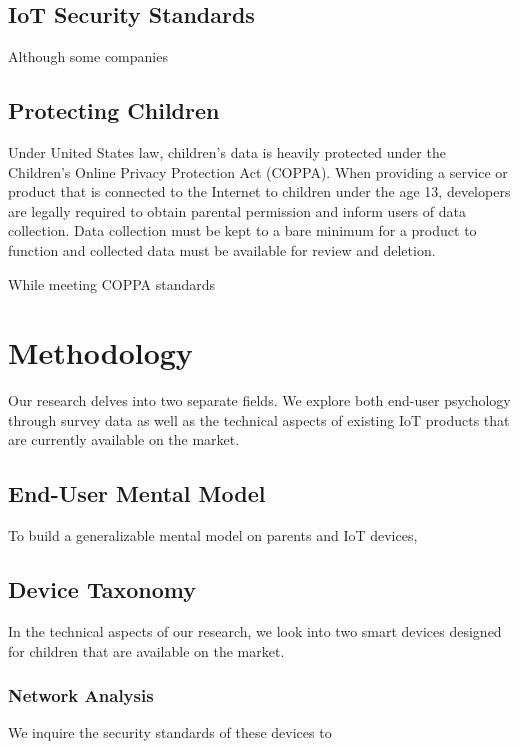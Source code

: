 \documentclass[12pt]{ucthesis}
\begin{document}
\section{IoT Security Standards}
Although some companies 

\section{Protecting Children}
Under United States law, children's data is heavily protected under the Children's Online Privacy Protection Act (COPPA). When providing a service or product that is connected to the Internet to children under the age 13, developers are legally required to obtain parental permission and inform users of data collection. Data collection must be kept to a bare minimum for a product to function and collected data must be available for review and deletion.

While meeting COPPA standards    \cite{reyes:coppa}

\cite{le:skillbot}


\chapter{Methodology}
\label{ch:methodology}
Our research delves into two separate fields. We explore both end-user psychology through survey data as well as the technical aspects of existing IoT products that are currently available on the market.

\section{End-User Mental Model}
To build a generalizable mental model on parents and IoT devices, 

\section{Device Taxonomy}
In the technical aspects of our research, we look into two smart devices designed for children that are available on the market. 

\subsection{Network Analysis}
We inquire the security standards of these devices to 
\end{document}
